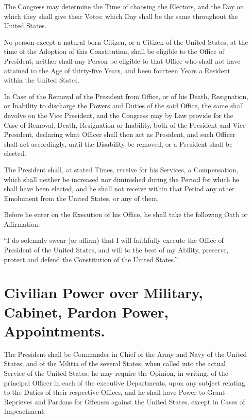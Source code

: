 \documentclass[12pt]{constitution}
\begin{document}
The Congress may determine the Time of choosing the Electors, and the Day on
which they shall give their Votes; which Day shall be the same throughout the
United States.

No person except a natural born Citizen, or a Citizen of the United States, at
the time of the Adoption of this Constitution, shall be eligible to the Office
of President; neither shall any Person be eligible to that Office who shall not
have attained to the Age of thirty-five Years, and been fourteen Years a
Resident within the United States.

In Case of the Removal of the President from Office, or of his Death,
Resignation, or Inability to discharge the Powers and Duties of the said
Office, the same shall devolve on the Vice President, and the Congress may by
Law provide for the Case of Removal, Death, Resignation or Inability, both of
the President and Vice President, declaring what Officer shall then act as
President, and such Officer shall act accordingly, until the Disability be
removed, or a President shall be elected.

The President shall, at stated Times, receive for his Services, a Compensation,
which shall neither be increased nor diminished during the Period for which he
shall have been elected, and he shall not receive within that Period any other
Emolument from the United States, or any of them.

Before he enter on the Execution of his Office, he shall take the following
Oath or Affirmation:

``I do solemnly swear (or affirm) that I will faithfully execute the Office of
President of the United States, and will to the best of my Ability, preserve,
protect and defend the Constitution of the United States.''


\section{Civilian Power over Military, Cabinet, Pardon Power, Appointments.}
The President shall be Commander in Chief of the Army and Navy of the United
States, and of the Militia of the several States, when called into the actual
Service of the United States; he may require the Opinion, in writing, of the
principal Officer in each of the executive Departments, upon any subject
relating to the Duties of their respective Offices, and he shall have Power to
Grant Reprieves and Pardons for Offenses against the United States, except in
Cases of Impeachment.
\end{document}
